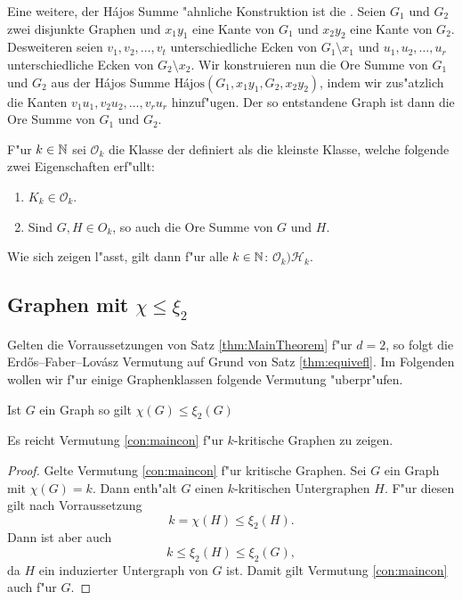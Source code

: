 Eine weitere, der H\'ajos Summe "ahnliche Konstruktion ist die  \cite{Ore67}. Seien $G_1$ und $G_2$ zwei disjunkte Graphen und $x_1y_1$ eine Kante von $G_1$ und $x_2y_2$ eine Kante von $G_2$. Desweiteren seien $v_1,v_2,\dots,v_t$ unterschiedliche Ecken von $G_1\setminus x_1$ und $u_1,u_2,\dots,u_r$ unterschiedliche Ecken von $G_2\setminus x_2$. Wir konstruieren nun die Ore Summe von $G_1$ und $G_2$ aus der H\'ajos Summe
$\text{H\'ajos}(G_1,x_1y_1, G_2, x_2y_2)$, indem wir zus"atzlich die Kanten $v_1u_1,v_2u_2,\dots,v_ru_r$ hinzuf"ugen. Der so entstandene Graph ist dann die Ore Summe von $G_1$ und $G_2$. 

F"ur $k\in {\mathbb{N}}$ sei $\mathcal{O}_k$ die Klasse der  definiert als die kleinste Klasse, welche folgende zwei Eigenschaften erf"ullt:
\begin{enumerate}
  \item $K_k\in \mathcal{O}_k$.
  \item Sind $G,H\in O_k$, so auch die Ore Summe von $G$ und $H$.
\end{enumerate}

Wie sich zeigen l"asst, gilt dann f"ur alle $k\in{\mathbb{N}}$: $\mathcal{O}_k ) \mathcal{H}_k$.

\subsection{Graphen mit $\chi \leq \xi_{2}$}

Gelten die Vorraussetzungen von Satz \ref{thm:MainTheorem} f"ur $d=2$, so folgt die Erd\H{o}s--Faber--Lov\'asz Vermutung auf Grund von Satz \ref{thm:equivefl}. Im Folgenden wollen wir f"ur einige Graphenklassen folgende Vermutung "uberpr"ufen.
\begin{conjecture}
  Ist $G$ ein Graph so gilt $\chi(G) \leq \xi_{2}(G)$
  \label{con:maincon}
\end{conjecture}

\begin{remark}
  Es reicht Vermutung \ref{con:maincon} f"ur $k$-kritische Graphen zu zeigen. 
\end{remark}

\begin{proof}
  Gelte Vermutung \ref{con:maincon} f"ur kritische Graphen.
  Sei $G$ ein Graph mit $\chi(G) = k$. Dann enth"alt $G$ einen $k$-kritischen Untergraphen $H$. F"ur diesen gilt nach Vorraussetzung $$k= \chi(H) \leq \xi_{2}(H).$$ Dann ist aber auch $$k \leq \xi_{2}(H) \leq \xi_{2}(G) ,$$ da $H$ ein induzierter Untergraph von $G$ ist.  Damit gilt Vermutung \ref{con:maincon} auch f"ur $G$.
\end{proof}

